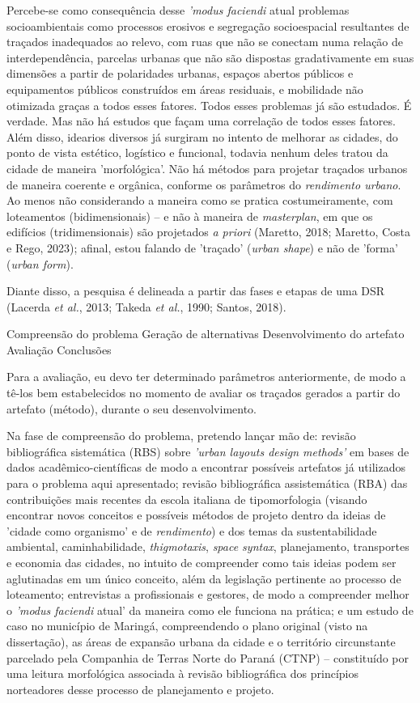 \documentclass[]{report}
\begin{document}
    Percebe-se como consequência desse \textit{'modus faciendi} atual problemas socioambientais como processos erosivos e segregação socioespacial resultantes de traçados inadequados ao relevo, com ruas que não se conectam numa relação de interdependência, parcelas urbanas que não são dispostas gradativamente em suas dimensões a partir de polaridades urbanas, espaços abertos públicos e equipamentos públicos construídos em áreas residuais, e mobilidade não otimizada graças a todos esses fatores. Todos esses problemas já são estudados. É verdade. Mas não há estudos que façam uma correlação de todos esses fatores. Além disso, idearios diversos já surgiram no intento de melhorar as cidades, do ponto de vista estético, logístico e funcional, todavia nenhum deles tratou da cidade de maneira 'morfológica'. Não há métodos para projetar traçados urbanos de maneira coerente e orgânica, conforme os parâmetros do \textit{rendimento urbano}. Ao menos não considerando a maneira como se pratica costumeiramente, com loteamentos (bidimensionais) – e não à maneira de \textit{masterplan}, em que os edifícios (tridimensionais) são projetados \textit{a priori} (Maretto, 2018; Maretto, Costa e Rego, 2023); afinal, estou falando de 'traçado' (\textit{urban shape}) e não de 'forma' (\textit{urban form}). %

    Diante disso, a pesquisa é delineada a partir das fases e etapas de uma DSR (Lacerda \textit{et al.}, 2013; Takeda \textit{et al.}, 1990; Santos, 2018).

    Compreensão do problema
    Geração de alternativas
    Desenvolvimento do artefato
    Avaliação
    Conclusões

    Para a avaliação, eu devo ter determinado parâmetros anteriormente, de modo a tê-los bem estabelecidos no momento de avaliar os traçados gerados a partir do artefato (método), durante o seu desenvolvimento.

    Na fase de compreensão do problema, pretendo lançar mão de: revisão bibliográfica sistemática (RBS) sobre \textit{'urban layouts design methods'} em bases de dados acadêmico-científicas de modo a encontrar possíveis artefatos já utilizados para o problema aqui apresentado; revisão bibliográfica assistemática (RBA) das contribuições mais recentes da escola italiana de tipomorfologia (visando encontrar novos conceitos e possíveis métodos de projeto dentro da ideias de 'cidade como organismo' e de \textit{rendimento}) e dos temas da sustentabilidade ambiental, caminhabilidade, \textit{thigmotaxis}, \textit{space syntax}, planejamento, transportes e economia das cidades, no intuito de compreender como tais ideias podem ser aglutinadas em um único conceito, além da legislação pertinente ao processo de loteamento;  entrevistas a profissionais e gestores, de modo a compreender melhor o \textit{'modus faciendi} atual' da maneira como ele funciona na prática; e um estudo de caso no município de Maringá, compreendendo o plano original (visto na dissertação), as áreas de expansão urbana da cidade e o território circunstante parcelado pela Companhia de Terras Norte do Paraná (CTNP) – constituído por uma leitura morfológica associada à revisão bibliográfica dos princípios norteadores desse processo de planejamento e projeto.
\end{document}
